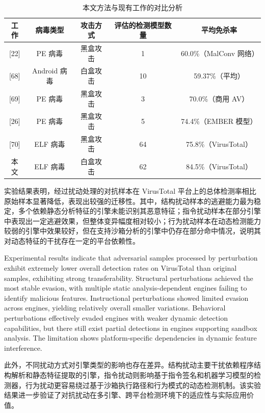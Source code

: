 \begin{table}[htbp]
	\centering
	\caption{本文方法与现有工作的对比分析}
	\label{tab:5.14}
	\begin{tabular*}{\textwidth}{@{\extracolsep{\fill}}ccccc}
		\toprule
		工作 & 病毒类型 & 攻击方式 & 评估的检测模型数量 & 平均免杀率 \\
		\midrule
		{[22]} & PE 病毒 & 黑盒攻击 & 1 & 60.0\%（MalConv 网络） \\
		{[68]} & Android 病毒 & 白盒攻击 & 10 & 59.37\%（平均） \\
		{[69]} & PE 病毒 & 黑盒攻击 & 3 & 70.0\%（商用 AV） \\
		{[26]} & PE 病毒 & 黑盒攻击 & 5 & 74.4\%（EMBER 模型） \\
		{[70]} & ELF 病毒 & 黑盒攻击 & 64 & 75.8\%（VirusTotal） \\
		本文 & ELF 病毒 & 白盒攻击 & 62 & 84.5\%（VirusTotal） \\
		\bottomrule
	\end{tabular*}
\end{table}

实验结果表明，经过扰动处理的对抗样本在 VirusTotal 平台上的总体检测率相比原始样本显著降低，表现出较强的迁移性。其中，结构扰动样本的逃避能力最为稳定，多个依赖静态分析特征的引擎未能识别其恶意特征；指令扰动样本在部分引擎中表现出一定逃避效果，但整体变异幅度相对较小；行为扰动样本在动态检测能力较弱的引擎中效果较好，但在支持沙箱分析的引擎中仍存在部分命中情况，说明其对动态特征的干扰存在一定的平台依赖性。

Experimental results indicate that adversarial samples processed by perturbation exhibit extremely lower overall detection rates on VirusTotal than original samples, exhibiting strong transferability. Structural perturbations achieved the most stable evasion, with multiple static analysis-dependent engines failing to identify malicious features. Instructional perturbations showed limited evasion across engines, yielding relatively overall smaller variations. Behavioral perturbations effectively evaded engines with weaker dynamic detection capabilities, but there still exist partial detections in engines supporting sandbox analysis. The limitation shows platform-specific dependencies in dynamic feature interference.

此外，不同扰动方式对引擎类型的影响也存在差异。结构扰动主要干扰依赖程序结构解析和静态特征提取的引擎，指令扰动则影响基于指令签名和机器学习模型的检测器，行为扰动更容易绕过基于沙箱执行路径和行为模式的动态检测机制。该实验结果进一步验证了对抗扰动在多引擎、跨平台检测环境下的适应性与实际应用价值。

